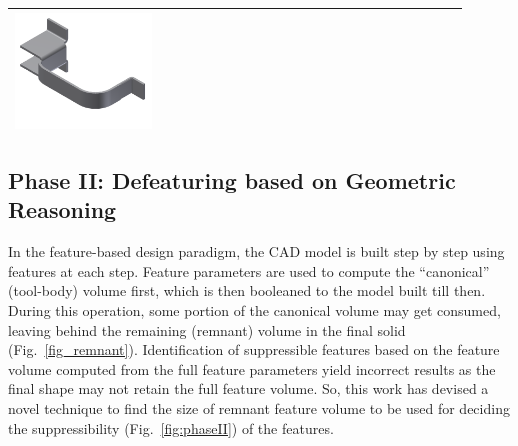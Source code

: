 \begin{minipage}[t]{\linewidth}
\begin{tabular}[h]{@{} p{0.3\linewidth} p{0.3\linewidth}  p{0.3\linewidth}@{}}
\includegraphics[width=0.98\linewidth]{..//Common/images/DefeatBracketPhase_I_3} \\ \bottomrule

\end{tabular}
\label{fig:phaseI}
\end{minipage}

\subsection{Phase II: Defeaturing based on Geometric Reasoning} \label{ph2}

In the feature-based design paradigm, the CAD model is built step by step using features at each step. Feature parameters are used to compute the ``canonical'' (tool-body) volume first, which is then booleaned to the model built till then. During this operation, some portion of the canonical volume may get consumed, leaving behind the remaining (remnant) volume in the final solid  (Fig.~\ref{fig_remnant}). Identification of suppressible features based on the feature volume computed from the full feature parameters yield incorrect results as the final shape may not retain the full feature volume. So, this work has devised a novel technique  to find the size of remnant feature volume to be used for deciding the suppressibility  (Fig.~\ref{fig:phaseII}) of the features.

